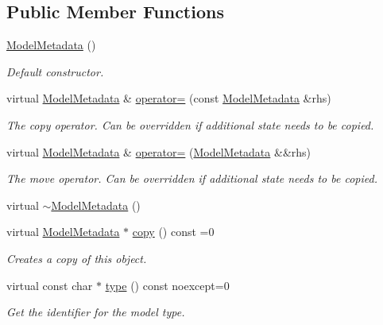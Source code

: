 \subsection*{Public Member Functions}
\begin{DoxyCompactItemize}
\item 
\hyperlink{group___classification_module_ga839013c5b7cbf03571fd141fbb0620b4}{Model\+Metadata} ()
\begin{DoxyCompactList}\small\item\em Default constructor. \end{DoxyCompactList}\item 
virtual \hyperlink{classdg_1_1deepcore_1_1classification_1_1_model_metadata}{Model\+Metadata} \& \hyperlink{group___classification_module_gac896bd743678834ed3b9fa036030c739}{operator=} (const \hyperlink{classdg_1_1deepcore_1_1classification_1_1_model_metadata}{Model\+Metadata} \&rhs)
\begin{DoxyCompactList}\small\item\em The copy operator. Can be overridden if additional state needs to be copied. \end{DoxyCompactList}\item 
virtual \hyperlink{classdg_1_1deepcore_1_1classification_1_1_model_metadata}{Model\+Metadata} \& \hyperlink{group___classification_module_ga5f6229dc9ebfe42df3729cfc76d593cf}{operator=} (\hyperlink{classdg_1_1deepcore_1_1classification_1_1_model_metadata}{Model\+Metadata} \&\&rhs)
\begin{DoxyCompactList}\small\item\em The move operator. Can be overridden if additional state needs to be copied. \end{DoxyCompactList}\item 
virtual \hyperlink{classdg_1_1deepcore_1_1classification_1_1_model_metadata_a958d757e0031ca02105806c51268c9c3}{$\sim$\+Model\+Metadata} ()
\item 
virtual \hyperlink{classdg_1_1deepcore_1_1classification_1_1_model_metadata}{Model\+Metadata} $\ast$ \hyperlink{group___classification_module_ga851d179b56e5c32b25512df0141f3ca2}{copy} () const =0
\begin{DoxyCompactList}\small\item\em Creates a copy of this object. \end{DoxyCompactList}\item 
virtual const char $\ast$ \hyperlink{group___classification_module_ga5d7ed12ccbf9bda3bd29b6d59648db76}{type} () const noexcept=0
\begin{DoxyCompactList}\small\item\em Get the identifier for the model type. \end{DoxyCompactList}\item 

\end{DoxyCompactItemize}
